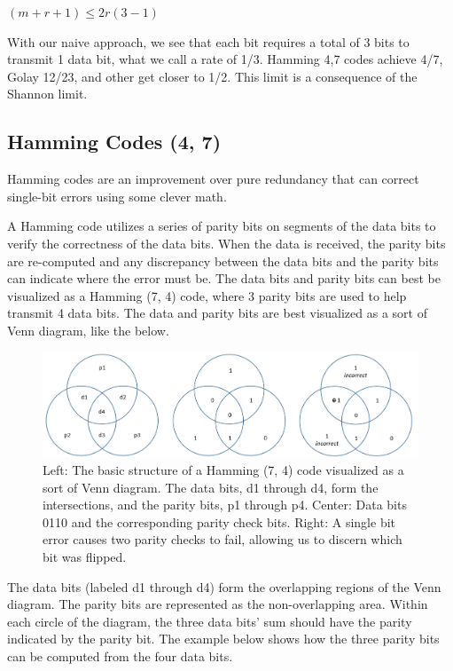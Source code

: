 \documentclass[12pt]{article}
\begin{document}
$(m + r + 1) ≤ 2 r (3-1)$ \cite{tanenbaum}

With our naive approach, we see that each bit requires a total of 3 bits to transmit 1 data bit, what we call a rate of 1/3. Hamming 4,7 codes achieve 4/7, Golay 12/23, and other get closer to 1/2. This limit is a consequence of the Shannon limit. \cite{pless}

\subsection{Hamming Codes (4, 7)}

Hamming codes are an improvement over pure redundancy that can correct single-bit errors using some clever math. 

A Hamming code utilizes a series of parity bits on segments of the data bits to verify the correctness of the data bits. When the data is received, the parity bits are re-computed and any discrepancy between the data bits and the parity bits can indicate where the error must be. The data bits and parity bits can best be visualized as a Hamming (7, 4) code, where 3 parity bits are used to help transmit 4 data bits. The data and parity bits are best visualized as a sort of Venn diagram, like the below.

\begin{figure}[h!]
 \centering
 \includegraphics[width=\textwidth]{img/Hamming.png}
 \caption{Left: The basic structure of a Hamming (7, 4) code visualized as a sort of Venn diagram. The data bits, d1 through d4, form the intersections, and the parity bits, p1 through p4. Center: Data bits 0110 and the corresponding parity check bits. Right: A single bit error causes two parity checks to fail, allowing us to discern which bit was flipped.}
 \label{fig:hamming}
 \end{figure}

The data bits (labeled d1 through d4) form the overlapping regions of the Venn diagram. The parity bits are represented as the non-overlapping area. Within each circle of the diagram, the three data bits' sum should have the parity indicated by the parity bit. The example below shows how the three parity bits can be computed from the four data bits.
\end{document}
